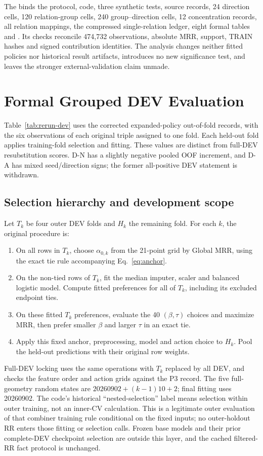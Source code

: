 \documentclass[11pt,a4paper]{article}
\begin{document}
The  binds the protocol, code, three synthetic tests, source records, 24 direction cells, 120 relation-group cells, 240 group--direction cells, 12 concentration records, all relation mappings, the compressed single-relation ledger, eight formal tables and . Its checks reconcile 474,732 observations, absolute MRR, support, TRAIN hashes and signed contribution identities. The analysis changes neither fitted policies nor historical result artifacts, introduces no new significance test, and leaves the stronger external-validation claim unmade.
\FloatBarrier

\section{Formal Grouped DEV Evaluation}
\label{app:dev}
Table~\ref{tab:rerun-dev} uses the corrected expanded-policy out-of-fold records, with the six observations of each original triple assigned to one fold. Each held-out fold applies training-fold selection and fitting. These values are distinct from full-DEV resubstitution scores. D-N has a slightly negative pooled OOF increment, and D-A has mixed seed/direction signs; the former all-positive DEV statement is withdrawn.


\subsection{Selection hierarchy and development scope}
\label{app:selection-hierarchy}
Let $T_k$ be four outer DEV folds and $H_k$ the remaining fold. For each $k$, the original procedure is:
\begin{enumerate}
\item On all rows in $T_k$, choose $\alpha_{0,k}$ from the 21-point grid by Global MRR, using the exact tie rule accompanying Eq.~\eqref{eq:anchor}.
\item On the non-tied rows of $T_k$, fit the median imputer, scaler and balanced logistic model. Compute fitted preferences for all of $T_k$, including its excluded endpoint ties.
\item On these fitted $T_k$ preferences, evaluate the 40 $(\beta,\tau)$ choices and maximize MRR, then prefer smaller $\beta$ and larger $\tau$ in an exact tie.
\item Apply this fixed anchor, preprocessing, model and action choice to $H_k$. Pool the held-out predictions with their original row weights.
\end{enumerate}
Full-DEV locking uses the same operations with $T_k$ replaced by all DEV, and checks the feature order and action grids against the P3 record. The five full-geometry random states are $20260902+(k-1)10+2$; final fitting uses 20260902. The code's historical ``nested-selection'' label means selection within outer training, not an inner-CV calculation. This is a legitimate outer evaluation of that combiner training rule conditional on the fixed inputs; no outer-holdout RR enters those fitting or selection calls. Frozen base models and their prior complete-DEV checkpoint selection are outside this layer, and the cached filtered-RR fact protocol is unchanged.
\end{document}
